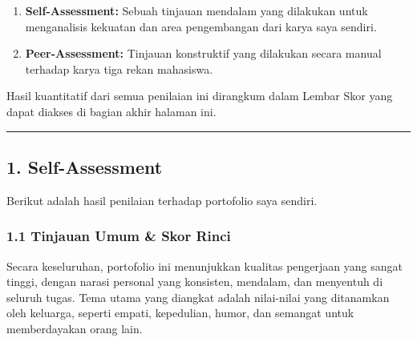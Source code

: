 \documentclass[
  letterpaper,
  DIV=11,
  numbers=noendperiod]{scrreprt}
\providecommand{\tightlist}{%
  \setlength{\itemsep}{0pt}\setlength{\parskip}{0pt}}
\begin{document}
\begin{enumerate}
\def\labelenumi{\arabic{enumi}.}
\tightlist
\item
  \textbf{Self-Assessment:} Sebuah tinjauan mendalam yang dilakukan
  untuk menganalisis kekuatan dan area pengembangan dari karya saya
  sendiri.
\item
  \textbf{Peer-Assessment:} Tinjauan konstruktif yang dilakukan secara
  manual terhadap karya tiga rekan mahasiswa.
\end{enumerate}

Hasil kuantitatif dari semua penilaian ini dirangkum dalam Lembar Skor
yang dapat diakses di bagian akhir halaman ini.

\begin{center}\rule{0.5\linewidth}{0.5pt}\end{center}

\subsection{1. Self-Assessment}\label{self-assessment}

Berikut adalah hasil penilaian terhadap portofolio saya sendiri.

\subsubsection{1.1 Tinjauan Umum \& Skor
Rinci}\label{tinjauan-umum-skor-rinci}

Secara keseluruhan, portofolio ini menunjukkan kualitas pengerjaan yang
sangat tinggi, dengan narasi personal yang konsisten, mendalam, dan
menyentuh di seluruh tugas. Tema utama yang diangkat adalah nilai-nilai
yang ditanamkan oleh keluarga, seperti empati, kepedulian, humor, dan
semangat untuk memberdayakan orang lain.
\end{document}
